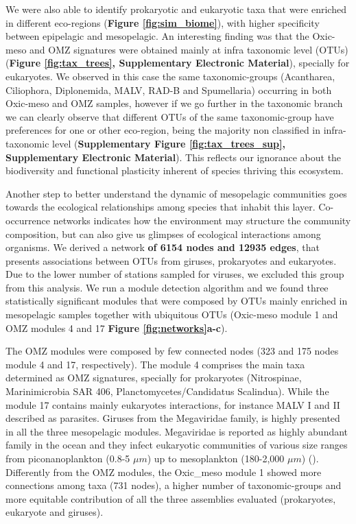 \documentclass[fleqn,10pt]{wlscirep}
\begin{document}
We were also able to identify prokaryotic and eukaryotic taxa that were enriched in different eco-regions (\textbf{Figure \ref{fig:sim_biome}}), with higher specificity between epipelagic and mesopelagic. An interesting finding was that the Oxic-meso and OMZ signatures were obtained mainly at infra taxonomic level (OTUs) (\textbf{Figure \ref{fig:tax_trees}, Supplementary Electronic Material}), specially for eukaryotes. We observed in this case the same taxonomic-groups (Acantharea, Ciliophora, Diplonemida, MALV, RAD-B and Spumellaria) occurring in both Oxic-meso and OMZ samples, however if we go further in the taxonomic branch we can clearly observe that different OTUs of the same taxonomic-group have preferences for one or other eco-region, being the majority non classified in infra-taxonomic level (\textbf{Supplementary Figure \ref{fig:tax_trees_sup}, Supplementary Electronic Material}). This reflects our ignorance about the biodiversity and functional
plasticity inherent of species thriving this ecosystem.

Another step to better understand the dynamic of mesopelagic communities goes towards the ecological relationships among species that inhabit this layer. Co-occurrence networks indicates how the environment may structure the community composition, but can also give us glimpses of ecological interactions among organisms. We derived a network \textbf{of 6154 nodes and 12935 edges}, that presents associations between OTUs from giruses, prokaryotes and eukaryotes. Due to the lower number of stations sampled for viruses, we excluded this group from this analysis. We run a module detection algorithm and we found three statistically significant modules that were composed by OTUs mainly enriched in mesopelagic  samples together with ubiquitous OTUs (Oxic-meso module 1 and OMZ modules 4 and 17 \textbf{Figure \ref{fig:networks}a-c}).

The OMZ modules were composed by few connected nodes (323 and 175 nodes module 4 and 17, respectively).  The module 4 comprises the main taxa determined as OMZ signatures, specially for prokaryotes (Nitrospinae, Marinimicrobia SAR 406, Planctomycetes/Candidatus Scalindua). While the module 17 contains mainly eukaryotes interactions, for instance MALV I and II described as parasites. Giruses from the Megaviridae family, is highly presented in all the three mesopelagic modules. Megaviridae is reported as highly abundant family in the ocean and they infect eukaryotic communities of various size ranges from piconanoplankton (0.8-5 $\mu m$) up to mesoplankton (180-2,000 $\mu m$) (\cite{mihara_taxon_2018}). Differently from the OMZ modules, the Oxic\_meso module 1 showed more connections among taxa (731 nodes), a higher number of taxonomic-groups and more equitable contribution of all the three assemblies evaluated (prokaryotes, eukaryote and giruses). 
\end{document}
